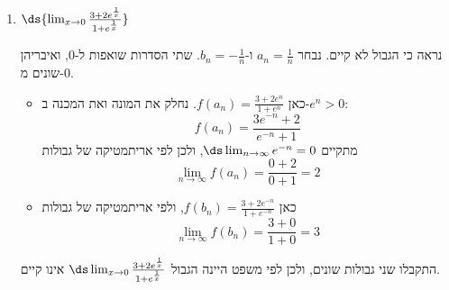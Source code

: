 \begin{enumerate}
\item $\ds{\lim_{x\to0}\frac{3+2e^{\frac1x}}{1+e^{\frac1x}}}$
\ifsol
{}
\begin{solbox}
נראה כי הגבול לא קיים. נבחר $a_n=\frac1n$ ו-$b_n=-\frac1n$. שתי הסדרות שואפות ל-$0$, ואיבריהן שונים מ-$0$.
\begin{itemize}
\item כאן $f(a_n)=\frac{3+2e^{n}}{1+e^{n}}$. נחלק את המונה ואת המכנה ב-$e^n>0$:
\[f(a_n)=\frac{3e^{-n}+2}{e^{-n}+1}\]
מתקיים $\ds\lim_{n\to\infty}e^{-n}=0$, ולכן לפי אריתמטיקה של גבולות
\[\lim_{n\to\infty}f(a_n)=\frac{0+2}{0+1}=2\]
\item כאן $f(b_n)=\frac{3+2e^{-n}}{1+e^{-n}}$, ולפי אריתמטיקה של גבולות
\[\lim_{n\to\infty}f(b_n)=\frac{3+0}{1+0}=3\]
\end{itemize}
התקבלו שני גבולות שונים, ולכן לפי משפט היינה הגבול $\ds\lim_{x\to0}\frac{3+2e^{\frac1x}}{1+e^{\frac1x}}$ אינו קיים.
\end{solbox}
\fi
\eMs
\end{enumerate}
